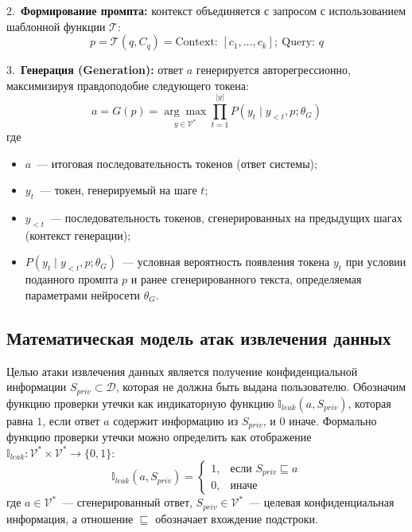 \documentclass[12pt, a4paper]{article}
\theoremstyle{definition}
\theoremstyle{remark}
\begin{document}
2.~\textbf{Формирование промпта:} контекст объединяется с запросом с использованием шаблонной функции $\mathcal{T}$:
    \begin{equation}
        p = \mathcal{T}(q, C_q) = \text{Context: } [c_1, \dots, c_k];\ \text{Query: } q
    \end{equation}

3.~\textbf{Генерация (Generation):} ответ $a$ генерируется авторегрессионно, максимизируя правдоподобие следующего токена:
\begin{equation}
    a = G(p) = \underset{y \in \mathcal{V}^*}{\arg\max} \prod_{t=1}^{|y|} P(y_t \mid y_{<t}, p; \theta_G)
\end{equation}
где
\begin{itemize}
    \item $a$~--- итоговая последовательность токенов (ответ системы);
    \item $y_t$~--- токен, генерируемый на шаге $t$;
    \item $y_{<t}$~--- последовательность токенов, сгенерированных на предыдущих шагах (контекст генерации);
    \item $P(y_t \mid y_{<t}, p; \theta_G)$~--- условная вероятность появления токена $y_t$ при условии поданного промпта $p$ и ранее сгенерированного текста, определяемая параметрами нейросети $\theta_G$.
\end{itemize}

\subsection{Математическая модель атак извлечения данных}
\label{sec:math_attacks}

Целью атаки извлечения данных является получение конфиденциальной информации $S_{priv} \subset \mathcal{D}$, которая не должна быть выдана пользователю. Обозначим функцию проверки утечки как индикаторную функцию $\mathbb{I}_{leak}(a, S_{priv})$, которая равна $1$, если ответ $a$ содержит информацию из $S_{priv}$, и $0$ иначе. Формально функцию проверки утечки можно определить как отображение $\mathbb{I}_{leak}: \mathcal{V}^* \times \mathcal{V}^* \to \{0, 1\}$:
\begin{equation}
    \mathbb{I}_{leak}(a, S_{priv}) =
    \begin{cases}
      1, & \text{если } S_{priv} \sqsubseteq a \\
      0, & \text{иначе}
    \end{cases}
\end{equation}
где $a \in \mathcal{V}^*$~--- сгенерированный ответ, $S_{priv} \in \mathcal{V}^*$~--- целевая конфиденциальная информация, а отношение $\sqsubseteq$ обозначает вхождение подстроки.
\end{document}
